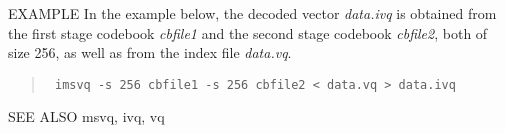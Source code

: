 \begin{options}
\end{options}

\begin{qsection}{EXAMPLE}
In the example below,
the decoded vector {\em data.ivq} is obtained
from the first stage codebook {\em cbfile1}
and the second stage codebook {\em cbfile2},
both of size 256, as well as from the index file {\em data.vq}.
\begin{quote}
\verb! imsvq -s 256 cbfile1 -s 256 cbfile2 < data.vq > data.ivq!
\end{quote}
\end{qsection}

\begin{qsection}{SEE ALSO}
msvq, ivq, vq
\end{qsection}
